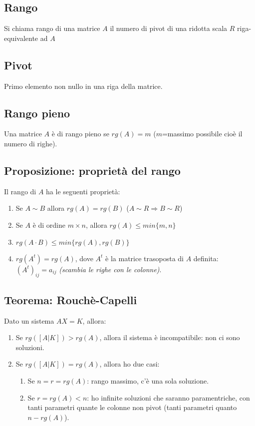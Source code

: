 \subsection{Rango}
Si chiama rango di una matrice \(A\) il numero di pivot di una ridotta scala \(R\) riga-equivalente ad \(A\)

\subsection{Pivot}
Primo elemento non nullo in una riga della matrice.

\subsection{Rango pieno}
Una matrice \(A\) è di rango pieno se \(rg(A)=m\) (\(m\)=massimo possibile cioè il numero di righe).

\subsection{Proposizione: proprietà del rango}
Il rango di \(A\) ha le seguenti proprietà:

\begin{enumerate}
	\item Se \(A\sim B\) allora \(rg(A)=rg(B)\) (\(A\sim R\Rightarrow B\sim R\))
	\item Se \(A\) è di ordine \(m\times n\), allora \(rg(A)\leq min\{m,n\}\)
	\item \(rg(A\cdot B)\leq min\{rg(A),rg(B)\}\)
	\item \(rg(A^t)=rg(A)\), dove \(A^t\) è la matrice trasoposta di \(A\) definita: \((A^t)_{ij}=a_{ij}\) \textit{(scambia le righe con le colonne)}.
\end{enumerate} 

\subsection{Teorema: Rouchè-Capelli}
Dato un sistema \(AX=K\), allora:
\begin{enumerate}
	\item Se \(rg([A|K])>rg(A)\), allora il sistema è incompatibile: non ci sono soluzioni.
	\item Se \(rg([A|K])=rg(A)\), allora ho due casi:

	\begin{enumerate}
		\item Se \(n=r=rg(A)\): rango massimo, c'è una sola soluzione.
		\item Se \(r=rg(A)<n\): ho infinite soluzioni che saranno paramentriche, con tanti parametri quante le colonne non pivot (tanti parametri quanto \(n-rg(A)\)).
	\end{enumerate}	
	
\end{enumerate}
